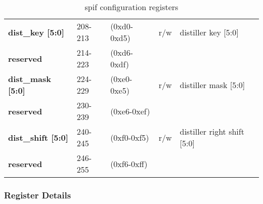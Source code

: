 \documentclass[11pt,a4paper,twoside]{article}
\begin{document}
\begin{center}
\begin{table}[!h]
\begin{tabularx}{\textwidth}{| p{37mm} p{13mm} p{21mm} p{6mm} X |}
		\textbf{dist\_key [5:0]}             & 208-213                    & (0xd0-0xd5)                    & r/w                 & distiller key [5:0]  \\%
		\cellcolor{gray!25}\textbf{reserved} & \cellcolor{gray!25}214-223 & \cellcolor{gray!25}(0xd6-0xdf) & \cellcolor{gray!25} & \cellcolor{gray!25}  \\%
		\textbf{dist\_mask [5:0]}            & 224-229                    & (0xe0-0xe5)                    & r/w                 & distiller mask [5:0] \\%
		\cellcolor{gray!25}\textbf{reserved} & \cellcolor{gray!25}230-239 & \cellcolor{gray!25}(0xe6-0xef) & \cellcolor{gray!25} & \cellcolor{gray!25}  \\%
		\textbf{dist\_shift [5:0]}           & 240-245                    & (0xf0-0xf5)                    & r/w                 & distiller right shift [5:0] \\%
		\cellcolor{gray!25}\textbf{reserved} & \cellcolor{gray!25}246-255 & \cellcolor{gray!25}(0xf6-0xff) & \cellcolor{gray!25} & \cellcolor{gray!25}  \\%
		\hline
	\end{tabularx}
	\caption{spif configuration registers}
	\label{tab:spif_regs}
\end{table}
\end{center}


\vspace{-5mm}
    
\subsubsection*{Register Details}
\end{document}

